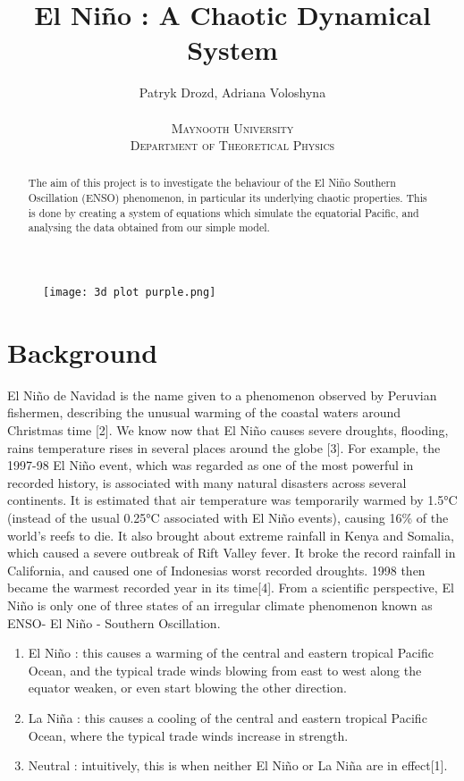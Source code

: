\documentclass{article}
\title{El Niño : A Chaotic Dynamical System}
\author{
         Patryk Drozd, Adriana Voloshyna \\[4ex]
         \begin{minipage}[t]{4cm}
             \small
            \textsc{Maynooth University}
         \end{minipage} \quad
         \begin{minipage}[t]{6cm}
             \small
            \textsc{Department of Theoretical Physics}
         \end{minipage}
    }
\date{}
\begin{document}
\maketitle

\begin{figure}[h]
\centering
\texttt{[image: 3d plot purple.png]}
\caption{\label{fig:Diagram}}
\end{figure}


\begin{abstract}
The aim of this project is to investigate the behaviour of the El Niño Southern Oscillation (ENSO) phenomenon, in particular its underlying chaotic properties. This is done by creating a system of equations which simulate the equatorial Pacific, and analysing the data obtained from our simple model. 
\end{abstract}

\newpage

\section{Background}
El Niño de Navidad is the name given to a phenomenon observed by Peruvian fishermen, describing the unusual warming of the coastal waters around Christmas time [2]. We know now that El Niño causes severe droughts, flooding, rains temperature rises in several places around the globe [3]. For example, the 1997-98 El Niño event, which was regarded as one of the most powerful in recorded history, is associated with many natural disasters across several continents. It is estimated that air temperature was temporarily warmed by 1.5°C (instead of the usual 0.25°C associated with El Niño events), causing 16\% of the world's reefs to die. It also brought about extreme rainfall in Kenya and Somalia, which caused a severe outbreak of Rift Valley fever. It broke the record rainfall in California, and caused one of Indonesias worst recorded droughts. 1998 then became the warmest recorded year in its time[4].  From a scientific perspective, El Niño is only one of three states of an irregular climate phenomenon known as ENSO- El Niño - Southern Oscillation. 

\begin{enumerate}

\item El Niño : this causes a warming of the central and eastern tropical Pacific Ocean, and the typical trade winds blowing from east to west along the equator weaken, or even start blowing the other direction.

\item La Niña : this causes a cooling of the central and eastern tropical Pacific Ocean, where the typical trade winds increase in strength. 

\item Neutral : intuitively, this is when neither El Niño or La Niña are in effect[1]. 

\end{enumerate}
\end{document}
